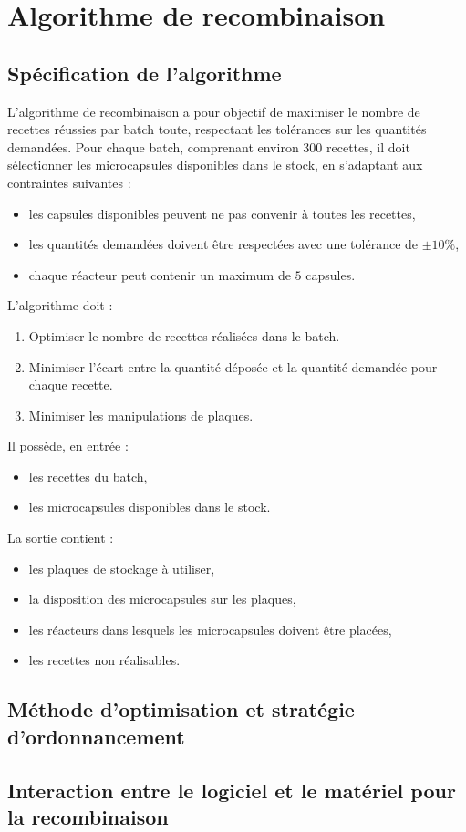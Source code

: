 \section{Algorithme de recombinaison}
\subsection{Spécification de l'algorithme}
L'algorithme de recombinaison a pour objectif de maximiser le nombre de recettes réussies par batch toute, respectant les tolérances sur les quantités demandées.
 Pour chaque batch, comprenant environ $300$ recettes, il doit sélectionner les microcapsules disponibles dans le stock,
 en s'adaptant aux contraintes suivantes :
\begin{itemize}
    \item les capsules disponibles peuvent ne pas convenir à toutes les recettes,
    \item les quantités demandées doivent être respectées avec une tolérance de $\pm 10\%$,
    \item chaque réacteur peut contenir un maximum de $5$ capsules.
\end{itemize}
L'algorithme doit :
\begin{enumerate}
    \item Optimiser le nombre de recettes réalisées dans le batch.
    \item Minimiser l'écart entre la quantité déposée et la quantité demandée pour chaque recette.
    \item Minimiser les manipulations de plaques.
\end{enumerate}
Il possède, en entrée : 
\begin{itemize}
    \item les recettes du batch,
    \item les microcapsules disponibles dans le stock.
\end{itemize}

La sortie contient : 
\begin{itemize}
    \item les plaques de stockage à utiliser,
    \item la disposition des microcapsules sur les plaques,
    \item les réacteurs dans lesquels les microcapsules doivent être placées,
    \item les recettes non réalisables.
\end{itemize}
\subsection{Méthode d'optimisation et stratégie d'ordonnancement}
\subsection{Interaction entre le logiciel et le matériel pour la recombinaison}
